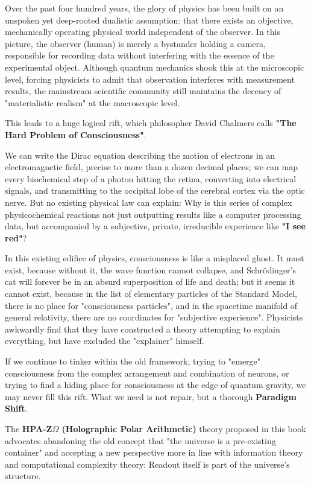 Over the past four hundred years, the glory of physics has been built on an unspoken yet deep-rooted dualistic assumption: that there exists an objective, mechanically operating physical world independent of the observer. In this picture, the observer (human) is merely a bystander holding a camera, responsible for recording data without interfering with the essence of the experimental object. Although quantum mechanics shook this at the microscopic level, forcing physicists to admit that observation interferes with measurement results, the mainstream scientific community still maintains the decency of "materialistic realism" at the macroscopic level.

This leads to a huge logical rift, which philosopher David Chalmers calls \textbf{"The Hard Problem of Consciousness"}.

We can write the Dirac equation describing the motion of electrons in an electromagnetic field, precise to more than a dozen decimal places; we can map every biochemical step of a photon hitting the retina, converting into electrical signals, and transmitting to the occipital lobe of the cerebral cortex via the optic nerve. But no existing physical law can explain: Why is this series of complex physicochemical reactions not just outputting results like a computer processing data, but accompanied by a subjective, private, irreducible experience like \textbf{"I see red"}?

In this existing edifice of physics, consciousness is like a misplaced ghost. It must exist, because without it, the wave function cannot collapse, and Schrödinger's cat will forever be in an absurd superposition of life and death; but it seems it cannot exist, because in the list of elementary particles of the Standard Model, there is no place for "consciousness particles", and in the spacetime manifold of general relativity, there are no coordinates for "subjective experience". Physicists awkwardly find that they have constructed a theory attempting to explain everything, but have excluded the "explainer" himself.

If we continue to tinker within the old framework, trying to "emerge" consciousness from the complex arrangement and combination of neurons, or trying to find a hiding place for consciousness at the edge of quantum gravity, we may never fill this rift. What we need is not repair, but a thorough \textbf{Paradigm Shift}.

The \textbf{HPA-Z$\Omega$ (Holographic Polar Arithmetic)} theory proposed in this book advocates abandoning the old concept that "the universe is a pre-existing container" and accepting a new perspective more in line with information theory and computational complexity theory: Readout itself is part of the universe's structure.


